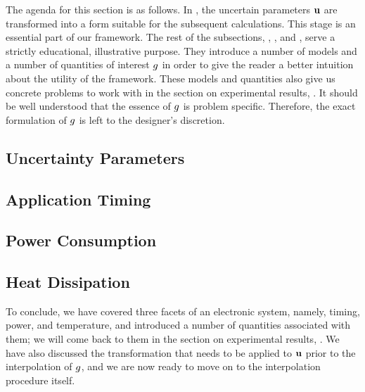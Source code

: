 The agenda for this section is as follows. In , the uncertain
parameters $\mathbf{u}$ are transformed into a form suitable for the subsequent
calculations. This stage is an essential part of our framework. The rest of the
subsections, , , and , serve a strictly
educational, illustrative purpose. They introduce a number of models and a
number of quantities of interest $g$ in order to give the reader a better
intuition about the utility of the framework. These models and quantities also
give us concrete problems to work with in the section on experimental results,
. It should be well understood that the essence of $g$ is
problem specific. Therefore, the exact formulation of $g$ is left to the
designer's discretion.

\subsection{Uncertainty Parameters} 


\subsection{Application Timing} 


\subsection{Power Consumption} 


\subsection{Heat Dissipation} 


To conclude, we have covered three facets of an electronic system, namely,
timing, power, and temperature, and introduced a number of quantities associated
with them; we will come back to them in the section on experimental results,
. We have also discussed the transformation that needs to
be applied to $\mathbf{u}$ prior to the interpolation of $g$, and we are now ready to
move on to the interpolation procedure itself.
